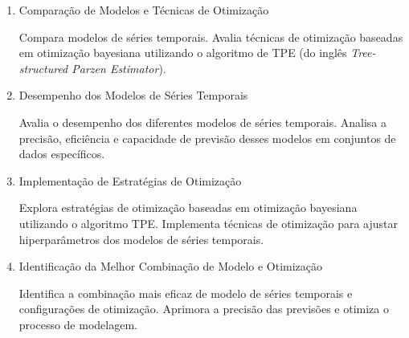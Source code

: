 %	
%
%
%
%
%
%
    
\begin{enumerate}
	\item Comparação de Modelos e Técnicas de Otimização
	
	Compara modelos de séries temporais.
	Avalia técnicas de otimização baseadas em otimização bayesiana utilizando o algoritmo de TPE (do inglês  \textit{Tree-structured Parzen Estimator}).
	
	\item  Desempenho dos Modelos de Séries Temporais
	
	Avalia o desempenho dos diferentes modelos de séries temporais.
	Analisa a precisão, eficiência e capacidade de previsão desses modelos em conjuntos de dados específicos.
	
	\item  Implementação de Estratégias de Otimização
	
	Explora estratégias de otimização baseadas em otimização bayesiana utilizando o algoritmo TPE.
	Implementa técnicas de otimização para ajustar hiperparâmetros dos modelos de séries temporais.
	
	\item Identificação da Melhor Combinação de Modelo e Otimização
	
	Identifica a combinação mais eficaz de modelo de séries temporais e configurações de otimização.
	Aprimora a precisão das previsões e otimiza o processo de modelagem.
\end{enumerate}
    
